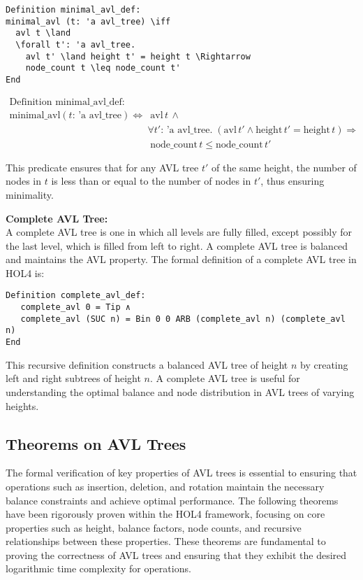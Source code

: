 \documentclass[12pt]{article}
\begin{document}
\begin{verbatim}
Definition minimal_avl_def:
minimal_avl (t: 'a avl_tree) \iff
  avl t \land
  \forall t': 'a avl_tree.
    avl t' \land height t' = height t \Rightarrow
    node_count t \leq node_count t'
End        
\end{verbatim}

\begin{align*}
\text{Definition minimal\_avl\_def:} \\
\text{minimal\_avl} (t: \, \text{'a avl\_tree}) \iff &
\; \text{avl} \, t \, \land \\
& \forall t': \, \text{'a avl\_tree}. \; (\text{avl} \, t' \land \text{height} \, t' = \text{height} \, t) \Rightarrow \\
& \; \text{node\_count} \, t \leq \text{node\_count} \, t'
\end{align*}

This predicate ensures that for any AVL tree \( t' \) of the same height, the number of nodes in \( t \) is less than or equal to the number of nodes in \( t' \), thus ensuring minimality.

\textbf{Complete AVL Tree:} \\
A complete AVL tree is one in which all levels are fully filled, except possibly for the last level, which is filled from left to right. A complete AVL tree is balanced and maintains the AVL property. The formal definition of a complete AVL tree in HOL4 is:
\begin{verbatim}
Definition complete_avl_def:
   complete_avl 0 = Tip ∧
   complete_avl (SUC n) = Bin 0 0 ARB (complete_avl n) (complete_avl n)
End
\end{verbatim}

This recursive definition constructs a balanced AVL tree of height \( n \) by creating left and right subtrees of height \( n \). A complete AVL tree is useful for understanding the optimal balance and node distribution in AVL trees of varying heights.

\subsection{Theorems on AVL Trees}

The formal verification of key properties of AVL trees is essential to ensuring that operations such as insertion, deletion, and rotation maintain the necessary balance constraints and achieve optimal performance. The following theorems have been rigorously proven within the HOL4 framework, focusing on core properties such as height, balance factors, node counts, and recursive relationships between these properties. These theorems are fundamental to proving the correctness of AVL trees and ensuring that they exhibit the desired logarithmic time complexity for operations.
\end{document}
